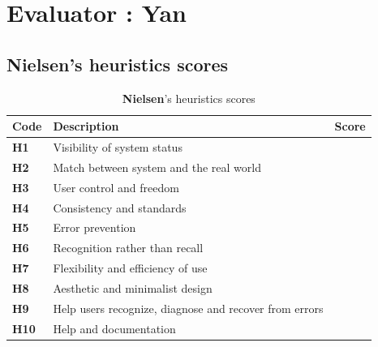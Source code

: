 
\section{Evaluator : Yan} 
\subsection{Nielsen’s heuristics scores}
\begin{table}[htp!]
	\centering
	\begin{tabular}{ |l|l|c| }
		\hline
		\textbf{Code} & \textbf{Description} & \textbf{Score}\\
		\hline
		\textbf{H1} & Visibility of system status & \textbf{\color{unicefOrange}{3}}\\
		\hline
		\textbf{H2} & Match between system and the real world & \textbf{\color{unicefGreen}{4}}\\
		\hline
		\textbf{H3} & User control and freedom & \textbf{\color{unicefGreen}{4}}\\
		\hline
		\textbf{H4} & Consistency and standards & \textbf{\color{unicefGreen}{4}}\\
		\hline
		\textbf{H5} & Error prevention & \textbf{\color{unicefGreen}{4}}\\
		\hline
		\textbf{H6} & Recognition rather than recall & \textbf{\color{unicefGreen}{4}}\\
		\hline
		\textbf{H7} & Flexibility and efficiency of use & \textbf{\color{unicefOrange}{3}}\\
		\hline
		\textbf{H8} & Aesthetic and minimalist design & \textbf{\color{unicefGreen}{4}}\\
		\hline
		\textbf{H9} & Help users recognize, diagnose and recover from errors & \textbf{\color{unicefGreen}{4}}\\
		\hline
		\textbf{H10} & Help and documentation & \textbf{\color{unicefGreen}{5}}\\
		\hline
	\end{tabular}
	\caption{\textbf{Nielsen}'s heuristics scores}
\end{table}
